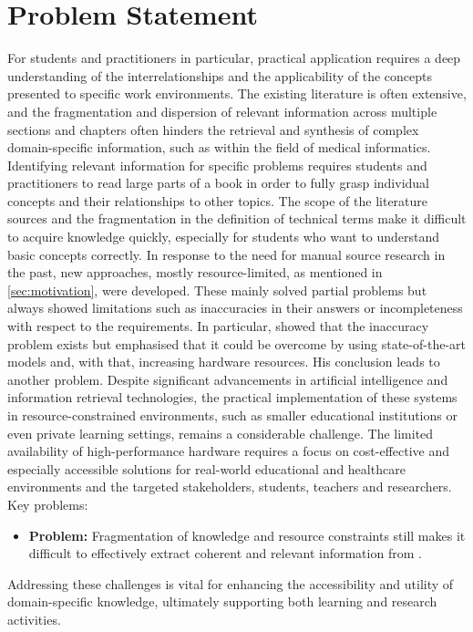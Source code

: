 \section{Problem Statement}\label{sec:problem statement}
For students and practitioners in particular, practical application requires a deep understanding of the interrelationships and the applicability of the concepts presented to specific work environments.
The existing literature is often extensive, and the fragmentation and dispersion of relevant information across multiple sections and chapters often hinders the retrieval and synthesis of complex domain-specific information, such as within the field of medical informatics.
Identifying relevant information for specific problems requires students and practitioners to read large parts of a book in order to fully grasp individual concepts and their relationships to other topics.
The scope of the literature sources and the fragmentation in the definition of technical terms make it difficult to acquire knowledge quickly, especially for students who want to understand basic concepts correctly.
%
In response to the need for manual source research in the past, new approaches, mostly resource-limited, as mentioned in \cref{sec:motivation}, were developed. 
These mainly solved partial problems but always showed limitations such as inaccuracies in their answers or incompleteness with respect to the requirements. 
%
In particular, \citet{Paul_Keller} showed that the inaccuracy problem exists but emphasised that it could be overcome by using state-of-the-art models and, with that, increasing hardware resources. 
His conclusion leads to another problem.    
Despite significant advancements in artificial intelligence and information retrieval technologies, the practical implementation of these systems in resource-constrained environments, such as smaller educational institutions or even private learning settings, remains a considerable challenge. 
The limited availability of high-performance hardware requires a focus on cost-effective and especially accessible solutions for real-world educational and healthcare environments and the targeted stakeholders, students, teachers and researchers.
%
Key problems:
\begin{itemize}
  \item \textbf{Problem:} Fragmentation of knowledge and resource constraints still makes it difficult to effectively extract coherent and relevant information from \citet{bb2}.
\end{itemize}
%
Addressing these challenges is vital for enhancing the accessibility and utility of domain-specific knowledge, ultimately supporting both learning and research activities. 

